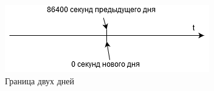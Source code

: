 \begin{figure}[h]
	\includegraphics[width=\linewidth]{pics/scheduleTime.png}
	\caption{Граница двух дней}
	\label{fig:time}
	\centering
\end{figure}





